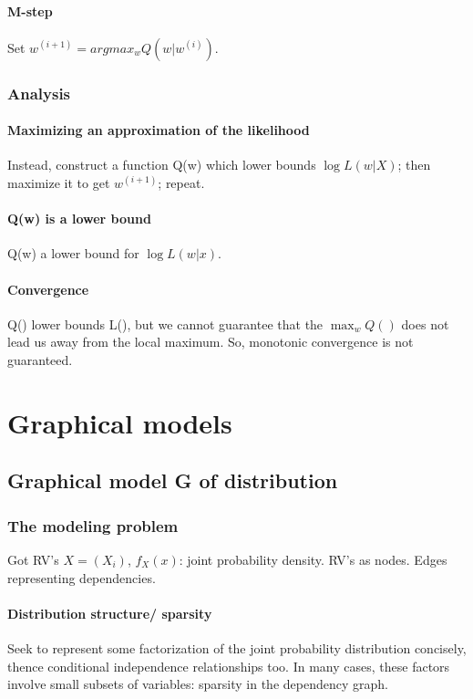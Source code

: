\documentclass[oneside, article]{memoir}
\begin{document}
\subsubsection{M-step}
Set $w^{(i+1)} = argmax_w Q(w | w^{(i)})$.

\subsection{Analysis}
\subsubsection{Maximizing an approximation of the likelihood}
Instead, construct a function Q(w) which lower bounds $\log L(w|X)$; then maximize it to get $w^{(i+1)}$; repeat.

\subsubsection{Q(w) is a lower bound}
Q(w) a lower bound for $\log L(w|x)$.

\subsubsection{Convergence}
Q() lower bounds L(), but we cannot guarantee that the $\max_w Q()$ does not lead us away from the local maximum. So, monotonic convergence is not guaranteed. \chk


\chapter{Graphical models}
\section{Graphical model G of distribution}
\subsection{The modeling problem}
Got RV's $X = (X_{i})$, $f_X(x)$: joint probability density. RV's as nodes. Edges representing dependencies.

\subsubsection{Distribution structure/ sparsity}
Seek to represent some factorization of the joint probability distribution concisely, thence conditional independence relationships too. In many cases, these factors involve small subsets of variables: sparsity in the dependency graph.
\end{document}
